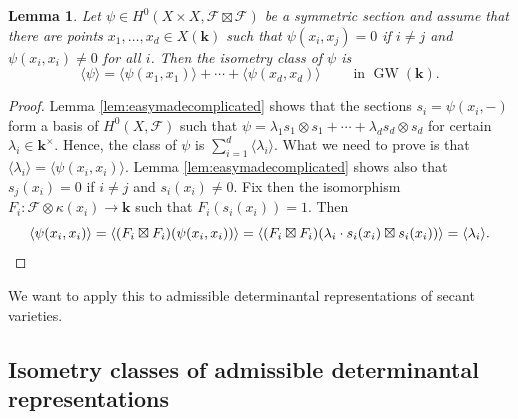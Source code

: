 \documentclass[12pt]{amsart}
\newcounter{thmcounter}
\numberwithin{equation}{section}
\numberwithin{thmcounter}{section}
\newtheorem{lemma}[thmcounter]{Lemma}
\theoremstyle{definition}
\theoremstyle{claim}
\newcommand{\kk}{\mathbf{k}}
\newcommand{\sF}{\mathscr{F}}
\DeclareMathOperator{\GW}{GW}
\begin{document}
\begin{lemma}\label{lem:signaturepsi}
	Let $\psi\in H^0(X\times X,\sF\boxtimes \sF)$ be a symmetric section and assume that there are points $x_1,\ldots,x_d\in X(\kk)$ such that $\psi(x_i,x_j)=0$ if $i\ne j$ and $\psi(x_i,x_i)\ne 0$ for all $i$. Then the isometry class of $\psi$ is
	\[ \langle \psi \rangle  = \langle \psi(x_1,x_1) \rangle + \cdots + \langle \psi(x_d,x_d) \rangle \qquad \text{ in } \GW(\kk). \]
\end{lemma}
\begin{proof}
	Lemma \ref{lem:easymadecomplicated} shows that the sections  $s_i=\psi(x_i,-)$ form a basis of $H^0(X,\sF)$ such that $\psi = \lambda_1 s_1\otimes s_1 + \cdots +\lambda_d s_d\otimes s_d$ for certain $\lambda_i\in\kk^{\times}$. Hence, the class of $\psi$ is $\sum_{i=1}^d \langle \lambda_i \rangle$. What we need to prove is that $\langle \lambda_i \rangle=\langle \psi(x_i,x_i) \rangle$. Lemma \ref{lem:easymadecomplicated} shows also that $s_j(x_i)=0$ if $i\ne j$ and $s_i(x_i)\ne 0$. Fix then the  isomorphism $F_i\colon \sF\otimes \kappa(x_i) \to \kk$ such that $F_i(s_i(x_i))=1$. Then
	\[ \langle \psi(x_i,x_i) \rangle = \langle (F_i\boxtimes F_i)(\psi(x_i,x_i)) \rangle = \langle (F_i\boxtimes F_i)(\lambda_i\cdot s_i(x_i)\boxtimes s_i(x_i)) \rangle = \langle \lambda_i \rangle. \qedhere \]
\end{proof}


We want to apply this to admissible determinantal representations of secant varieties.

\subsection{Isometry classes of admissible determinantal representations}
\end{document}
